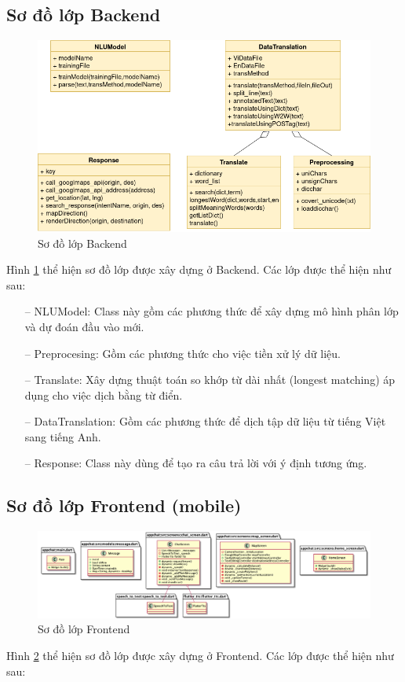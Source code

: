 \subsection{Sơ đồ lớp Backend}
\begin{figure}[H]
    \centering
    \includegraphics[width=15cm]{images/serverclassdiagram.png}
    \caption{Sơ đồ lớp Backend}
    \label{fig:serverclassdiagram} 
\end{figure}

Hình \ref{fig:serverclassdiagram} thể hiện sơ đồ lớp được xây dựng ở Backend. Các lớp được thể hiện như sau:

\begin{itemize}
    \item[--] NLUModel: Class này gồm các phương thức để xây dựng mô hình phân lớp và dự đoán đầu vào mới.
    \item[--] Preprocesing: Gồm các phương thức cho việc tiền xử lý dữ liệu.
    \item[--] Translate: Xây dựng thuật toán so khớp từ dài nhất (longest matching) áp dụng cho việc dịch bằng từ điển.
    \item[--] DataTranslation: Gồm các phương thức để dịch tập dữ liệu từ tiếng Việt sang tiếng Anh.
    \item[--] Response: Class này dùng để tạo ra câu trả lời với ý định tương ứng.
    
\end{itemize}


\subsection{Sơ đồ lớp Frontend (mobile)}
\begin{figure}[H]
    \centering
    \includegraphics[width=15cm]{images/classdiagram.png}
    \caption{Sơ đồ lớp Frontend}
    \label{fig:classdiagram} 
\end{figure}
Hình \ref{fig:classdiagram} thể hiện sơ đồ lớp được xây dựng ở Frontend. Các lớp được thể hiện như sau:

